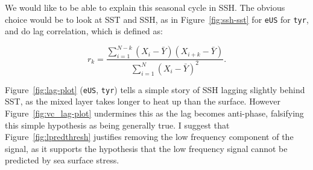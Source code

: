 







\label{sec:lag}



We would like to be able to explain this seasonal cycle in SSH.
The obvious choice would be to look at SST and SSH, as in Figure~\ref{fig:ssh-sst}
for \texttt{eUS} for \texttt{tyr}, and do lag correlation, which is defined as:

\begin{equation}
r_{k}=
\frac{\sum_{i=1}^{N-k}\left(X_{i}
-\bar{Y}\right)\left(X_{i+k}-\bar{Y}\right)}
{\sum_{i=1}^{N}\left(X_{i}
-\bar{Y}\right)^{2}}.
\end{equation}

Figure~\ref{fig:lag-plot} (\texttt{eUS}, \texttt{tyr}) tells a simple story of
SSH lagging slightly behind SST, as the mixed layer takes longer
to heat up than the surface.
However Figure~\ref{fig:vc_lag-plot} undermines this as the
lag becomes anti-phase, falsifying this simple hypothesis as
being generally true.
I suggest that Figure~\ref{fig:lpredthresh} justifies removing the low frequency
component of the signal, as it supports the hypothesis that the
low frequency signal cannot be predicted by sea surface stress.

\FloatBarrier
